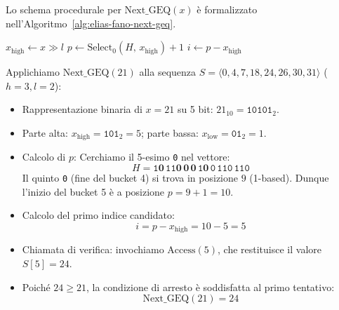 Lo schema procedurale per $\text{Next\_GEQ}(x)$ \`e formalizzato nell'Algoritmo~\ref{alg:elias-fano-next-geq}.

\begin{algorithm}[H]
\caption{Calcolo del Successore $\text{Next\_GEQ}(x)$ in Elias-Fano}
\label{alg:elias-fano-next-geq}
\BlankLine
$x_{\text{high}} \leftarrow x \gg l$
$p \leftarrow \text{Select}_0(H, \, x_{\text{high}}) + 1$
$i \leftarrow p - x_{\text{high}}$
\;
\end{algorithm}

\begin{example}
Applichiamo $\text{Next\_GEQ}(21)$ alla sequenza $S = \langle 0, 4, 7, 18, 24, 26, 30, 31 \rangle$ ($h = 3, l = 2$):
\begin{itemize}
  \item Rappresentazione binaria di $x = 21$ su 5 bit: $21_{10} = \texttt{10101}_2$.
  \item Parte alta: $x_{\text{high}} = \texttt{101}_2 = 5$; parte bassa: $x_{\text{low}} = \texttt{01}_2 = 1$.
  \item Calcolo di $p$: Cerchiamo il 5-esimo \texttt{0} nel vettore:
  \begin{equation*}
    H = \texttt{1} \mathbf{0} \, \texttt{11} \mathbf{0} \, \mathbf{0} \, \mathbf{0} \, \texttt{1} \mathbf{0} \, \texttt{0} \, \texttt{110} \, \texttt{110}
  \end{equation*}
  Il quinto \texttt{0} (fine del bucket 4) si trova in posizione $9$ (1-based).
  Dunque l'inizio del bucket 5 \`e a posizione $p = 9 + 1 = 10$.
  \item Calcolo del primo indice candidato:
  \begin{equation*}
    i = p - x_{\text{high}} = 10 - 5 = 5
  \end{equation*}
  \item Chiamata di verifica: invochiamo $\text{Access}(5)$, che restituisce il valore $S[5] = 24$.
  \item Poich\'e $24 \ge 21$, la condizione di arresto \`e soddisfatta al primo tentativo:
  \begin{equation*}
    \text{Next\_GEQ}(21) = 24
  \end{equation*}
\end{itemize}
\end{example}

